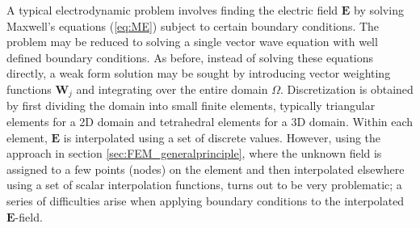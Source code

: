 A typical electrodynamic problem involves finding the electric field $\mathbf{E}$ by solving Maxwell's equations (\ref{eq:ME}) subject to certain boundary conditions. The problem may be reduced to solving a single vector wave equation with well defined boundary conditions. As before, instead of solving these equations directly, a weak form solution may be sought by introducing vector weighting functions $\mathbf{W}_j$ and integrating over the entire domain $\Omega$. Discretization is obtained by first dividing the domain into small finite elements, typically triangular elements for a 2D domain and tetrahedral elements for a 3D domain. Within each element, $\mathbf{E}$ is interpolated using a set of discrete values. However, using the approach in section \ref{sec:FEM_generalprinciple}, where the unknown field is assigned to a few points (nodes) on the element and then interpolated elsewhere using a set of scalar interpolation functions, turns out to be very problematic; a series of difficulties arise when applying boundary conditions to the interpolated $\mathbf{E}$-field\cite{FEM_in_EM_jianming_jin}\cite{FEM_TheoryAndCompOfEM_Jian-Ming_Jin}. 



